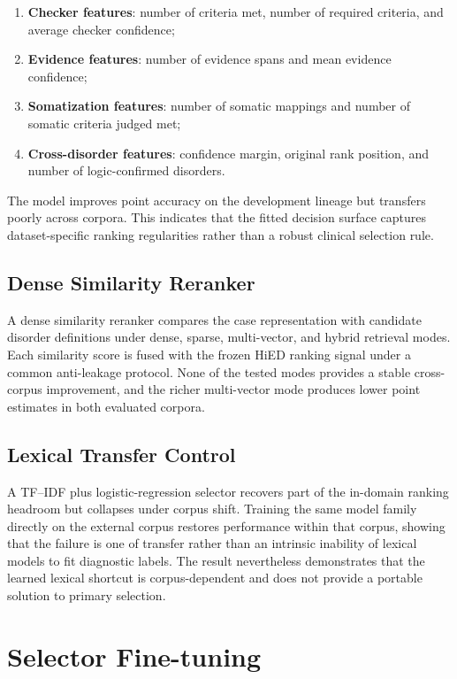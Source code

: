 \begin{enumerate}
  \item \textbf{Checker features}: number of criteria met, number of required
        criteria, and average checker confidence;
  \item \textbf{Evidence features}: number of evidence spans and mean evidence
        confidence;
  \item \textbf{Somatization features}: number of somatic mappings and number
        of somatic criteria judged met;
  \item \textbf{Cross-disorder features}: confidence margin, original rank
        position, and number of logic-confirmed disorders.
\end{enumerate}

The model improves point accuracy on the development lineage but transfers
poorly across corpora. This indicates that the fitted decision surface captures
dataset-specific ranking regularities rather than a robust clinical selection
rule.

\subsection{Dense Similarity Reranker}

A dense similarity reranker compares the case representation with candidate
disorder definitions under dense, sparse, multi-vector, and hybrid retrieval
modes. Each similarity score is fused with the frozen HiED ranking signal under
a common anti-leakage protocol. None of the tested modes provides a stable
cross-corpus improvement, and the richer multi-vector mode produces lower
point estimates in both evaluated corpora.

\subsection{Lexical Transfer Control}

A TF--IDF plus logistic-regression selector recovers part of the in-domain
ranking headroom but collapses under corpus shift. Training the same model
family directly on the external corpus restores performance within that
corpus, showing that the failure is one of transfer rather than an intrinsic
inability of lexical models to fit diagnostic labels. The result nevertheless
demonstrates that the learned lexical shortcut is corpus-dependent and does
not provide a portable solution to primary selection.

\section{Selector Fine-tuning}
\label{app:finetune}

